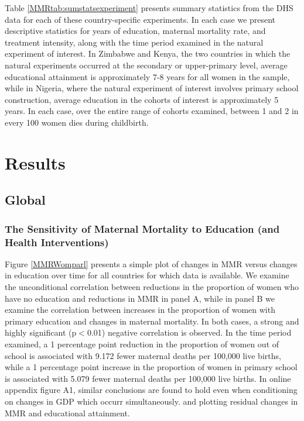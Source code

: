 \documentclass{article}[12pt,subeqn]
\begin{document}
\begin{spacing}{1.4}
Table \ref{MMRtab:sumstatsexperiment} presents summary statistics from the DHS 
data for each of these country-specific experiments.  In each case we present 
descriptive statistics for years of education, maternal mortality rate, and 
treatment intensity, along with the time period examined in the natural 
experiment of interest.  In Zimbabwe and Kenya, the two countries in which the 
natural experiments occurred at the secondary or upper-primary level, average 
educational attainment is approximately 7-8 years for all women in the sample, 
while in Nigeria, where the natural experiment of interest involves primary school 
construction, average education in the cohorts of interest is approximately 5 
years.  In each case, over the entire range of cohorts examined, between 1 and 2 
in every 100 women dies during childbirth.


\section{Results}
\subsection{Global}
\subsubsection{The Sensitivity of Maternal Mortality to Education (and Health 
  Interventions)}
Figure \ref{MMRWomparl} presents a simple plot of changes in MMR versus changes
in education over time for all countries for which data is available. We examine
the unconditional correlation between reductions in the proportion of women who
have no education and reductions in MMR in panel A, while in panel B we examine
the correlation between increases in the proportion of women with primary
education and changes in maternal mortality.  In both cases, a strong and highly
significant (p$<$0.01) negative correlation is observed. In the time period
examined, a 1 percentage point reduction in the proportion of women out of school
is associated with 9.172 fewer maternal deaths per 100,000 live births, while a 1
percentage point increase in the proportion of women in primary school is
associated with 5.079 fewer maternal deaths per 100,000 live births.  In
online appendix figure A1, similar conclusions are found to hold even when
conditioning on changes in GDP which occurr simultaneously. and plotting residual
changes in MMR and educational attainment.


\end{spacing}
\end{document}
